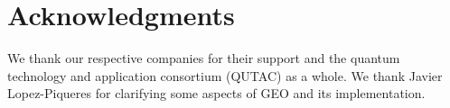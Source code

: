 \section{Acknowledgments}
We thank our respective companies for their support and the quantum  technology and application consortium (QUTAC) as a whole.  We thank Javier Lopez-Piqueres for clarifying some aspects of GEO and its implementation.